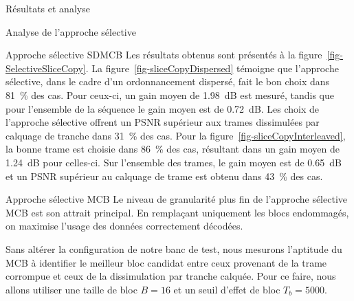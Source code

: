 \documentclass[letterpaper, twoside, 12pt,memoire]{thETS}
\newcommand{\fig}[1]{figure~\ref{#1}}
\begin{document}
\begin{chapter}{Résultats et analyse}
\begin{section}{Analyse de l'approche sélective}
\begin{subsection}{Approche sélective SDMCB}
Les résultats obtenus sont présentés à la \fig{fig-SelectiveSliceCopy}. La
\fig{fig-sliceCopyDispersed} témoigne que l'approche sélective, dans le cadre
d'un ordonnancement dispersé, fait le bon choix dans 81~\% des cas. Pour
ceux-ci, un gain moyen de 1.98~dB est mesuré, tandis que pour l'ensemble de la
séquence le gain moyen est de 0.72~dB. Les choix de l'approche sélective offrent
un PSNR supérieur aux trames dissimulées par calquage de tranche dans 31~\% des
cas. Pour la \fig{fig-sliceCopyInterleaved}, la bonne trame est choisie dans
86~\% des cas, résultant dans un gain moyen de 1.24~dB pour celles-ci. Sur
l'ensemble des trames, le gain moyen est de 0.65~dB et un PSNR supérieur au
calquage de trame est obtenu dans 43~\% des cas.

\end{subsection}
\begin{subsection}{Approche sélective MCB}
\label{sec-AnalyseMCB}
Le niveau de granularité plus fin de l’approche sélective MCB est son attrait
principal. En remplaçant uniquement les blocs endommagés, on maximise l’usage
des données correctement décodées.

Sans altérer la configuration de notre banc de test, nous mesurons l'aptitude du
MCB à identifier le meilleur bloc candidat entre ceux provenant de la trame
corrompue et ceux de la dissimulation par tranche calquée. Pour ce faire, nous
allons utiliser une taille de bloc $B=16$ et un seuil d'effet de bloc $T_b =
5000$.


\end{subsection}
\end{section}
\end{chapter}
\end{document}
